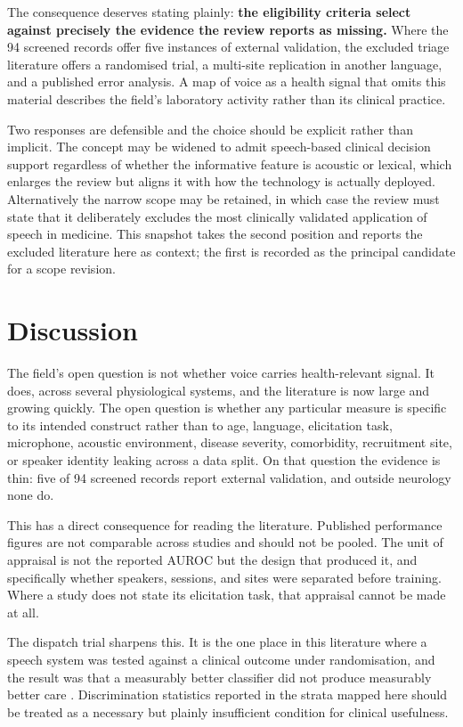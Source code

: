 \documentclass[11pt]{article}
\begin{document}
The consequence deserves stating plainly: \textbf{the eligibility criteria
select against precisely the evidence the review reports as missing.} Where the
94 screened records offer five instances of external validation, the
excluded triage literature offers a randomised trial, a multi-site replication
in another language, and a published error analysis. A map of voice as a health
signal that omits this material describes the field's laboratory activity rather
than its clinical practice.

Two responses are defensible and the choice should be explicit rather than
implicit. The concept may be widened to admit speech-based clinical decision
support regardless of whether the informative feature is acoustic or lexical,
which enlarges the review but aligns it with how the technology is actually
deployed. Alternatively the narrow scope may be retained, in which case the
review must state that it deliberately excludes the most clinically validated
application of speech in medicine. This snapshot takes the second position and
reports the excluded literature here as context; the first is recorded as the
principal candidate for a scope revision.

\section{Discussion}

The field's open question is not whether voice carries health-relevant signal.
It does, across several physiological systems, and the literature is now large
and growing quickly. The open question is whether any particular measure is
specific to its intended construct rather than to age, language, elicitation
task, microphone, acoustic environment, disease severity, comorbidity,
recruitment site, or speaker identity leaking across a data split. On that
question the evidence is thin: five of 94 screened records report external
validation, and outside neurology none do.

This has a direct consequence for reading the literature. Published performance
figures are not comparable across studies and should not be pooled. The unit of
appraisal is not the reported AUROC but the design that produced it, and
specifically whether speakers, sessions, and sites were separated before
training. Where a study does not state its elicitation task, that appraisal
cannot be made at all.

The dispatch trial sharpens this. It is the one place in this literature where a speech system was tested against a clinical outcome under randomisation, and the result was that a measurably better classifier did not produce measurably better care \citep{blomberg2021rct}. Discrimination statistics reported in the strata mapped here should be treated as a necessary but plainly insufficient condition for clinical usefulness.
\end{document}
